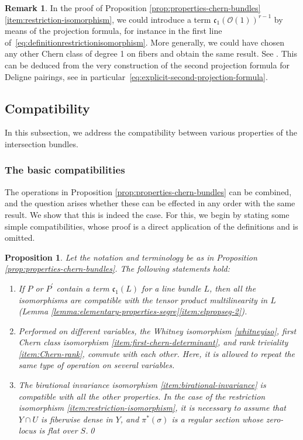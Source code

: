 \documentclass[JEP,XML,SOM,Unicode,published]{cedram}
\theoremstyle{plain}
\newtheorem{proposition}[theorem]{Proposition}
\theoremstyle{definition}
\newtheorem{remark}[theorem]{Remark}
\newcommand{\Ocal}{\mathcal O}
\newcommand{\cfrak}{\mathfrak c}
\begin{document}
\begin{remark}\label{rem:restriction-iso-chern-class-degree-1}
In the proof of Proposition \ref{prop:properties-chern-bundles}\eqref{item:restriction-isomorphism}, we could introduce a term $\cfrak_{1}(\Ocal(1))^{r-1}$ by means of the projection formula, for instance in the first line of~\eqref{eq:definitionrestrictionisomorphism}. More generally, we could have chosen any other Chern class of degree 1 on fibers and obtain the same result. See \cite[\textsection V.4.10]{Elkikfib}. This can be deduced from the very construction of the second projection formula for Deligne pairings, see in parti\-cu\-lar~\eqref{eq:explicit-second-projection-formula}.
\end{remark}

\subsection{Compatibility}\label{subsec:compatibility}
In this subsection, we address the compatibility between various properties of the intersection bundles.

\subsubsection{The basic compatibilities}\label{subsubsec:basic-compatibilites}
The operations in Proposition \ref{prop:properties-chern-bundles} can be combined, and the question arises whether these can be effected in any order with the same result. We show that this is indeed the case. For this, we begin by stating some simple compatibilities, whose proof is a direct application of the definitions and is omitted.

\begin{proposition}\label{prop:stupid-compatibilities}
Let the notation and terminology be as in Proposition \ref{prop:properties-chern-bundles}. The following statements hold:
\begin{enumerate}
\item If $P$ or $P^{\prime}$ contain a term $\cfrak_{1}(L)$ for a line bundle $L$, then all the isomorphisms are compatible with the tensor product multilinearity in $L$ (\cf Lemma \ref{lemma:elementary-properties-segre}\eqref{item:elpropseg-2}).
\item Performed on different variables, the Whitney isomorphism \eqref{whitneyiso}, first Chern class isomorphism \eqref{item:first-chern-determinant}, and rank triviality \eqref{item:Chern-rank}, commute with each other. Here, it is allowed to repeat the same type of operation on several variables.
\item\label{item:birational-comp} The birational invariance isomorphism \eqref{item:birational-invariance} is compatible with all the other properties. In the case of the restriction isomorphism \eqref{item:restriction-isomorphism}, it is necessary to assume that $Y \cap U$ is fiberwise dense in $Y$, and $\pi^{\ast}(\sigma)$ is a regular section whose zero-locus is flat over $S$.\qed
\end{enumerate}
\end{proposition}
\end{document}
